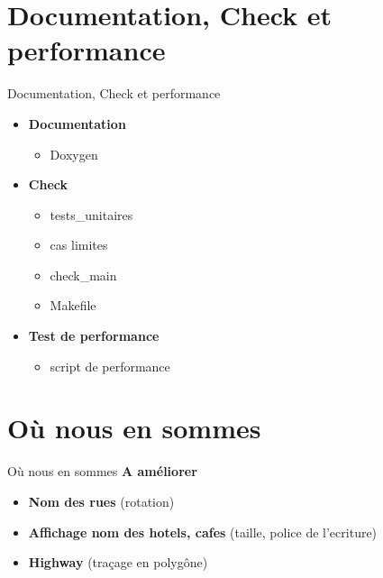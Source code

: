 \documentclass[french]{beamer}
\begin{document}
\section{Documentation, Check et performance}
\begin{frame}{Documentation, Check et performance}
  \begin{itemize}
	\item <1-9>\textbf{Documentation}
	\begin{itemize}
	\item  <2-9>Doxygen
	\end{itemize}
 	\item <3-9> \textbf{Check}
	\begin{itemize}
	\item  <4-9>tests\_unitaires
	\item  <5-9>cas limites
	\item  <6-9>check\_main
	\item  <7-9>Makefile
	\end{itemize}
	\item <8-9> \textbf{Test de performance}
	\begin{itemize}
	\item  <9>script de performance
	\end{itemize}
      \end{itemize}
\end{frame}

\section{Où nous en sommes}
\begin{frame}{Où nous en sommes}
	 \textbf{A améliorer}
	 \begin{itemize}
	 \item<1-3>\textbf{Nom des rues} (rotation)
	 \item<2-3>\textbf{Affichage nom des hotels, cafes} (taille, police de l'ecriture)
 	 \item<3> \textbf{Highway} (traçage en polygône)
	\end{itemize}
\end{frame}
\end{document}
